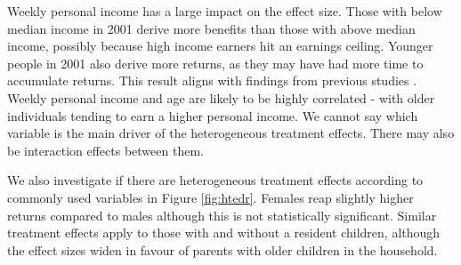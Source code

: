 \documentclass[12pt, a4paper]{article}
\begin{document}
Weekly personal income has a large impact on the effect size. Those with below median income in 2001 derive more benefits than those with above median income, possibly because high income earners hit an earnings ceiling. Younger people in 2001 also derive more returns, as they may have had more time to accumulate returns. This result aligns with findings from previous studies \citep{polidano2016,dorsett2016,perales2017}. Weekly personal income and age are likely to be highly correlated - with older individuals tending to earn a higher personal income. We cannot say which variable is the main driver of the heterogeneous treatment effects. There may also be interaction effects between them.

We also investigate if there are heterogeneous treatment effects according to commonly used variables in Figure \ref{fig:htedr}. Females reap slightly higher returns compared to males although this is not statistically significant. Similar treatment effects apply to those with and without a resident children, although the effect sizes widen in favour of parents with older children in the household. 
%
\end{document}
